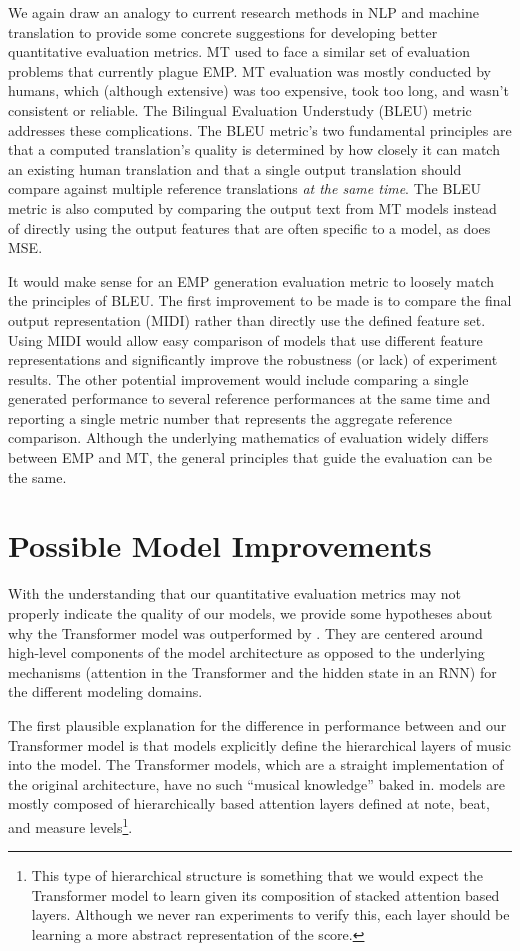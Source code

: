We again draw an analogy to current research methods in NLP and machine translation to provide some concrete suggestions for developing better quantitative evaluation metrics. MT used to face a similar set of evaluation problems that currently plague EMP. MT evaluation was mostly conducted by humans, which (although extensive) was too expensive, took too long, and wasn't consistent or reliable. The Bilingual Evaluation Understudy (BLEU) metric\cite{papineni2002bleu} addresses these complications. The BLEU metric's two fundamental principles are that a computed translation's quality is determined by how closely it can match an existing human translation and that a single output translation should compare against multiple reference translations \emph{at the same time}. The BLEU metric is also computed by comparing the output text from MT models instead of directly using the output features that are often specific to a model, as does MSE. 

It would make sense for an EMP generation evaluation metric to loosely match the principles of BLEU. The first improvement to be made is to compare the final output representation (MIDI) rather than directly use the defined feature set. Using MIDI would allow easy comparison of models that use different feature representations and significantly improve the robustness (or lack) of experiment results. The other potential improvement would include comparing a single generated performance to several reference performances at the same time and reporting a single metric number that represents the aggregate reference comparison. Although the underlying mathematics of evaluation widely differs between EMP and MT, the general principles that guide the evaluation can be the same. 

\section{Possible Model Improvements}
With the understanding that our quantitative evaluation metrics may not properly indicate the quality of our models, we provide some hypotheses about why the Transformer model was outperformed by \vnet{}. They are centered around high-level components of the model architecture as opposed to the underlying mechanisms (attention in the Transformer and the hidden state in an RNN) for the different modeling domains. 

The first plausible explanation for the difference in performance between \vnet{} and our Transformer model is that \vnet{} models explicitly define the hierarchical layers of music into the model. The Transformer models, which are a straight implementation of the original architecture, have no such ``musical knowledge'' baked in. \vnet{} models are mostly composed of hierarchically based attention layers defined at note, beat, and measure levels\footnote{This type of hierarchical structure is something that we would expect the Transformer model to learn given its composition of stacked attention based layers. Although we never ran experiments to verify this, each layer should be learning a more abstract representation of the score.}. 

